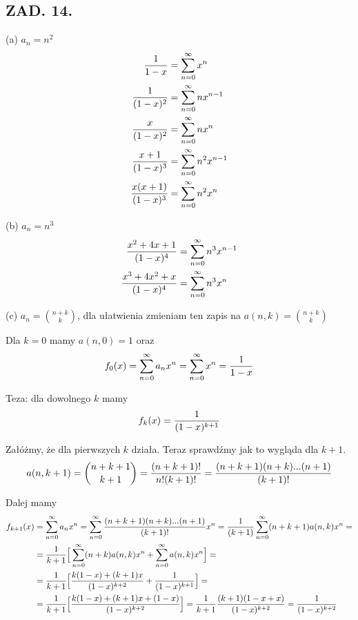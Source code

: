 \documentclass{article}[13pt]
\begin{document}
\subsection*{ZAD. 14.}

{\color{acc}(a)} $a_n=n^2$
\begin{align*}
    {1\over 1-x}&=\sum\limits_{n=0}^\infty x^n\\
    {1\over(1-x)^2}&=\sum\limits_{n=0}^\infty nx^{n-1}\\
    {x\over(1-x)^2}&=\sum\limits_{n=0}^\infty nx^n\\
    {x+1\over(1-x)^3}&=\sum\limits_{n=0}^\infty n^2x^{n-1}\\
    {x(x+1)\over(1-x)^3}&=\sum\limits_{n=0}^\infty n^2x^n
\end{align*}

{\color{acc}(b)} $a_n=n^3$
\begin{align*}
    {x^2+4x+1\over(1-x)^4}&=\sum\limits_{n=0}^\infty n^3x^{n-1}\\
    {x^3+4x^2+x\over (1-x)^4}&=\sum\limits_{n=0}^\infty n^3x^n
\end{align*}

{\color{acc}(c)} $a_n={n+k\choose k}$, dla ułatwienia zmieniam ten zapis na $a(n,k)={n+k\choose k}$
\medskip

Dla $k=0$ mamy $a(n,0)=1$ oraz
$$f_0(x)=\sum\limits_{n=0}^\infty a_nx^n=\sum\limits_{n=0}^\infty x^n={1\over 1-x}$$

Teza: dla dowolnego $k$ mamy
$$f_k(x)={1\over(1-x)^{k+1}}$$

Załóżmy, że dla pierwszych $k$ działa. Teraz sprawdźmy jak to wygląda dla $k+1$. 
$$a(n, k+1)={n+k+1\choose k+1}={(n+k+1)!\over n!(k+1)!}={(n+k+1)(n+k)...(n+1)\over (k+1)!}$$

Dalej mamy
\begin{align*}
    f_{k+1}(x)&=\sum\limits_{n=0}^\infty a_nx^n=\sum\limits_{n=0}^\infty{(n+k+1)(n+k)...(n+1)\over (k+1)!}x^n={1\over(k+1)}\sum\limits_{n=0}^\infty(n+k+1)a(n, k)x^n=\\
    &=\frac1{k+1}\Big[\sum\limits_{n=0}^\infty(n+k)a(n, k)x^n+\sum\limits_{n=0}^\infty a(n, k)x^n\Big]=\\
    &={1\over k+1}\Big[{k(1-x)+(k+1)x\over(1-x)^{k+2}}+{1\over(1-x)^{k+1}}\Big]=\\
    &={1\over k+1}\Big[{k(1-x)+(k+1)x+(1-x)\over (1-x)^{k+2}}\Big]=\frac1{k+1}{(k+1)(1-x+x)\over(1-x)^{k+2}}={1\over(1-x)^{k+2}}
\end{align*}
\end{document}
